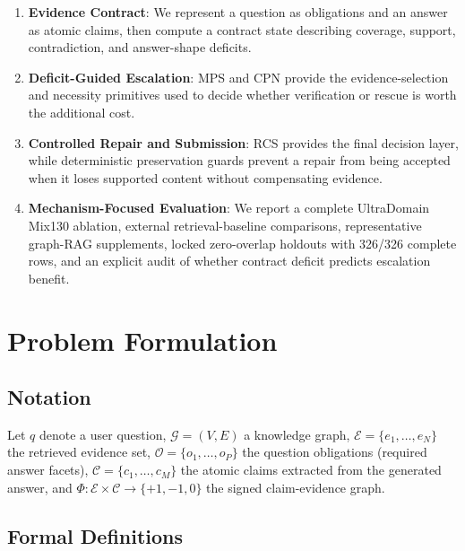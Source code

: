 \documentclass[journal,onecolumn,11pt]{IEEEtran}
\begin{document}
\begin{enumerate}
\item \textbf{Evidence Contract}: We represent a question as obligations and an answer as atomic claims, then compute a contract state describing coverage, support, contradiction, and answer-shape deficits.

\item \textbf{Deficit-Guided Escalation}: MPS and CPN provide the evidence-selection and necessity primitives used to decide whether verification or rescue is worth the additional cost.

\item \textbf{Controlled Repair and Submission}: RCS provides the final decision layer, while deterministic preservation guards prevent a repair from being accepted when it loses supported content without compensating evidence.

\item \textbf{Mechanism-Focused Evaluation}: We report a complete UltraDomain Mix130 ablation, external retrieval-baseline comparisons, representative graph-RAG supplements, locked zero-overlap holdouts with 326/326 complete rows, and an explicit audit of whether contract deficit predicts escalation benefit.
\end{enumerate}


\section{Problem Formulation}

\subsection{Notation}

Let $q$ denote a user question, $\mathcal{G} = (V, E)$ a knowledge graph, $\mathcal{E} = \{e_1, \ldots, e_N\}$ the retrieved evidence set, $\mathcal{O} = \{o_1, \ldots, o_P\}$ the question obligations (required answer facets), $\mathcal{C} = \{c_1, \ldots, c_M\}$ the atomic claims extracted from the generated answer, and $\Phi: \mathcal{E} \times \mathcal{C} \to \{+1, -1, 0\}$ the signed claim-evidence graph.

\subsection{Formal Definitions}
\end{document}
